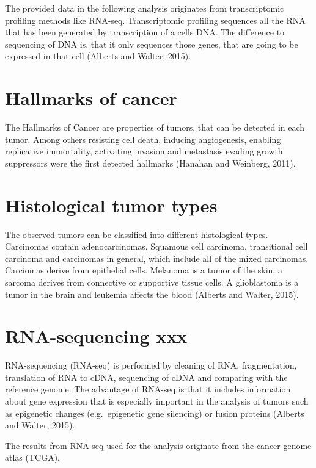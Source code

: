 \documentclass[
  parskip,
  oneside]{scrreprt}
\begin{document}
The provided data in the following analysis originates from
transcriptomic profiling methods like RNA-seq. Transcriptomic profiling
sequences all the RNA that has been generated by transcription of a
cells DNA. The difference to sequencing of DNA is, that it only
sequences those genes, that are going to be expressed in that cell
(Alberts and Walter, 2015).

\hypertarget{hallmarks-of-cancer}{%
\section{Hallmarks of cancer}\label{hallmarks-of-cancer}}

The Hallmarks of Cancer are properties of tumors, that can be detected
in each tumor. Among others resisting cell death, inducing angiogenesis,
enabling replicative immortality, activating invasion and metastasis
evading growth suppressors were the first detected hallmarks (Hanahan
and Weinberg, 2011).

\hypertarget{histological-tumor-types}{%
\section{Histological tumor types}\label{histological-tumor-types}}

The observed tumors can be classified into different histological types.
Carcinomas contain adenocarcinomas, Squamous cell carcinoma,
transitional cell carcinoma and carcinomas in general, which include all
of the mixed carcinomas. Carciomas derive from epithelial cells.
Melanoma is a tumor of the skin, a sarcoma derives from connective or
supportive tissue cells. A glioblastoma is a tumor in the brain and
leukemia affects the blood (Alberts and Walter, 2015).

\hypertarget{rna-sequencing-xxx}{%
\section{RNA-sequencing xxx}\label{rna-sequencing-xxx}}

RNA-sequencing (RNA-seq) is performed by cleaning of RNA, fragmentation,
translation of RNA to cDNA, sequencing of cDNA and comparing with the
reference genome. The advantage of RNA-seq is that it includes
information about gene expression that is especially important in the
analysis of tumors such as epigenetic changes (e.g.~epigenetic gene
silencing) or fusion proteins (Alberts and Walter, 2015).

The results from RNA-seq used for the analysis originate from the cancer
genome atlas (TCGA).
\end{document}
